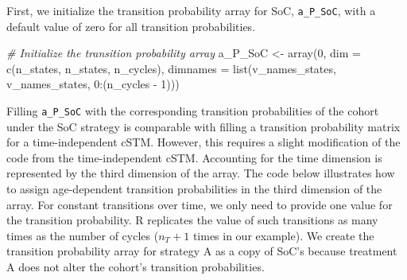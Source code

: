 \documentclass[
]{article}
\newenvironment{Shaded}{\begin{snugshade}}{\end{snugshade}}
\newcommand{\AttributeTok}[1]{\textcolor[rgb]{0.77,0.63,0.00}{#1}}
\newcommand{\CommentTok}[1]{\textcolor[rgb]{0.56,0.35,0.01}{\textit{#1}}}
\newcommand{\DecValTok}[1]{\textcolor[rgb]{0.00,0.00,0.81}{#1}}
\newcommand{\FunctionTok}[1]{\textcolor[rgb]{0.00,0.00,0.00}{#1}}
\newcommand{\NormalTok}[1]{#1}
\newcommand{\OtherTok}[1]{\textcolor[rgb]{0.56,0.35,0.01}{#1}}
\newcommand{\SpecialCharTok}[1]{\textcolor[rgb]{0.00,0.00,0.00}{#1}}
\begin{document}
First, we initialize the transition probability array for SoC, \texttt{a\_P\_SoC}, with a default value of zero for all transition probabilities.

\begin{Shaded}
\begin{Highlighting}[]
\CommentTok{\# Initialize the transition probability array}
\NormalTok{a\_P\_SoC }\OtherTok{\textless{}{-}} \FunctionTok{array}\NormalTok{(}\DecValTok{0}\NormalTok{, }\AttributeTok{dim =} \FunctionTok{c}\NormalTok{(n\_states, n\_states, n\_cycles),}
              \AttributeTok{dimnames =} \FunctionTok{list}\NormalTok{(v\_names\_states, v\_names\_states, }\DecValTok{0}\SpecialCharTok{:}\NormalTok{(n\_cycles }\SpecialCharTok{{-}} \DecValTok{1}\NormalTok{)))}
\end{Highlighting}
\end{Shaded}

Filling \texttt{a\_P\_SoC} with the corresponding transition probabilities of the cohort under the SoC strategy is comparable with filling a transition probability matrix for a time-independent cSTM. However, this requires a slight modification of the code from the time-independent cSTM. Accounting for the time dimension is represented by the third dimension of the array. The code below illustrates how to assign age-dependent transition probabilities in the third dimension of the array. For constant transitions over time, we only need to provide one value for the transition probability. R replicates the value of such transitions as many times as the number of cycles (\(n_T+1\) times in our example). We create the transition probability array for strategy A as a copy of SoC's because treatment A does not alter the cohort's transition probabilities.
\end{document}

